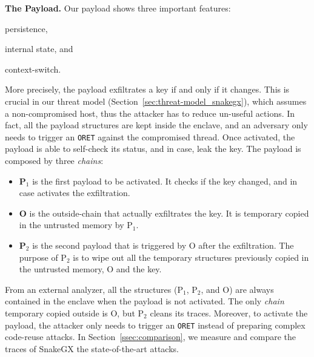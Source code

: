 \textbf{The Payload.}
Our payload shows three important features:
\begin{enumerate*}[label=(\roman*)]
	\item persistence,
	\item internal state, and
	\item context-switch.
\end{enumerate*}
More precisely, the payload exfiltrates a key if and only if it changes.
This is crucial in our threat model (Section~\ref{sec:threat-model_snakegx}), 
which 
assumes a non-compromised host, thus the attacker has to reduce 
un-useful actions.
In fact, all the payload structures are kept inside the enclave,
and an adversary only needs to trigger an \texttt{ORET} against the compromised
thread.
Once activated, the payload is able to self-check its status, and in case, leak 
the key.
The payload is composed by three \emph{chains}:
\begin{itemize}
	\item \textbf{P$_1$} is the first payload to be activated. It checks if the 
	key changed, and in case activates the exfiltration.
	\item \textbf{O} is the outside-chain that actually exfiltrates the key. 
	It 
	is temporary copied in the untrusted memory by P$_1$.
	\item \textbf{P$_2$} is the second payload that is triggered by O after 
	the 
	exfiltration. The purpose of P$_2$ is to wipe out all the temporary 
	structures 
	previously copied in the untrusted memory, \ie O and the key.
\end{itemize}
From an external analyzer, all the structures (\ie P$_1$, P$_2$, and O) are 
always
contained in the enclave when the payload is not activated.
The only \emph{chain} temporary copied outside is O, but P$_2$ cleans its 
traces.
Moreover, to activate the payload, the attacker only needs to trigger an 
\texttt{ORET} 
instead of preparing complex code-reuse attacks.
In Section~\ref{ssec:comparison}, we measure and compare the traces of SnakeGX
\wrt the state-of-the-art attacks.

